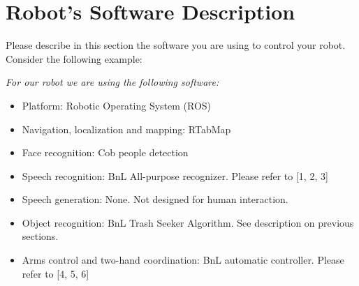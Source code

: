 \section*{Robot's Software Description}
Please describe in this section the software you are using to control your robot.
Consider the following example:

\textit{For our robot we are using the following software:}

\begin{itemize}
	\item Platform: Robotic Operating System (ROS)
	\item Navigation, localization and mapping: RTabMap
	\item Face recognition: Cob people detection
	\item Speech recognition: BnL All-purpose recognizer. Please refer to [1, 2, 3]
	\item Speech generation: None. Not designed for human interaction.
	\item Object recognition: BnL Trash Seeker Algorithm. See description on previous sections.
	\item Arms control and two-hand coordination: BnL automatic controller. Please refer to [4, 5, 6]
\end{itemize}